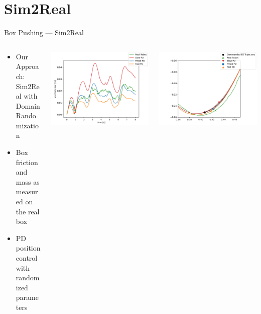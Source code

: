 \documentclass[16:9,en,navbarinfooter]{sdqbeamer}
\begin{document}
\section{Sim2Real}
\begin{frame}{Box Pushing --- Sim2Real}
\begin{columns}
    \begin{column}{0.2\textwidth}
        \begin{itemize}
                \item Our Approach: Sim2Real with Domain Randomization
                \item Box friction and mass as measured on the real box
                \item PD position control with randomized parameters 
        \end{itemize}
    \end{column}

    \begin{column}{0.4\textwidth}
\includegraphics[width=\linewidth]{media/ctrl_error.pdf}\\
    \end{column}

    \begin{column}{0.4\textwidth}
\includegraphics[width=\linewidth]{media/traj_error.pdf}
    \end{column}
\end{columns}


\end{frame}
\end{document}
